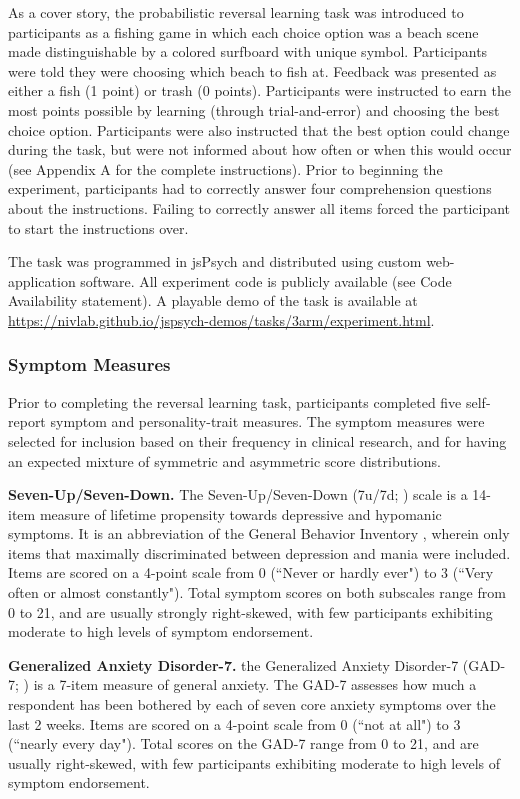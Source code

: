 \documentclass[a4paper,notitlepage,12pt]{article}
\begin{document}
As a cover story, the probabilistic reversal learning task was introduced to participants as a fishing game in which each choice option was a beach scene made distinguishable by a colored surfboard with unique symbol. Participants were told they were choosing which beach to fish at. Feedback was presented as either a fish (1 point) or trash (0 points). Participants were instructed to earn the most points possible by learning (through trial-and-error) and choosing the best choice option. Participants were also instructed that the best option could change during the task, but were not informed about how often or when this would occur (see Appendix A for the complete instructions). Prior to beginning the experiment, participants had to correctly answer four comprehension questions about the instructions. Failing to correctly answer all items forced the participant to start the instructions over.

The task was programmed in jsPsych \cite{deleeuw_2015_jspsych} and distributed using custom web-application software. All experiment code is publicly available (see Code Availability statement). A playable demo of the task is available at \url{https://nivlab.github.io/jspsych-demos/tasks/3arm/experiment.html}.

\subsubsection*{Symptom Measures}

Prior to completing the reversal learning task, participants completed five self-report symptom and personality-trait measures. The symptom measures were selected for inclusion based on their frequency in clinical research, and for having an expected mixture of symmetric and asymmetric score distributions. 

\textbf{Seven-Up/Seven-Down.} The Seven-Up/Seven-Down (7u/7d; \cite{youngstrom_2013_susd}) scale is a 14-item measure of lifetime propensity towards depressive and hypomanic symptoms. It is an abbreviation of the General Behavior Inventory \cite{depue1981behavioral}, wherein only items that maximally discriminated between depression and mania were included. Items are scored on a 4-point scale from 0 (``Never or hardly ever") to 3 (``Very often or almost constantly"). Total symptom scores on both subscales range from 0 to 21, and are usually strongly right-skewed, with few participants exhibiting moderate to high levels of symptom endorsement. 

\textbf{Generalized Anxiety Disorder-7.} the Generalized Anxiety Disorder-7 (GAD-7; \cite{spitzer2006brief}) is a 7-item measure of general anxiety. The GAD-7 assesses how much a respondent has been bothered by each of seven core anxiety symptoms over the last 2 weeks. Items are scored on a 4-point scale from 0 (``not at all") to 3 (``nearly every day"). Total scores on the GAD-7 range from 0 to 21, and are usually right-skewed, with few participants exhibiting moderate to high levels of symptom endorsement.
\end{document}
